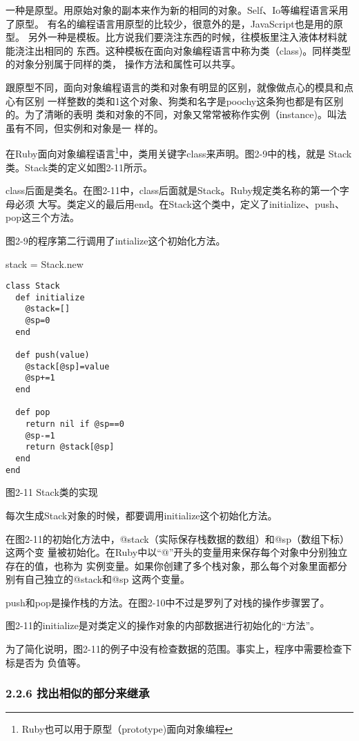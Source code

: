 \documentclass[11pt]{ctexart}
\begin{document}
一种是原型。用原始对象的副本来作为新的相同的对象。Self、Io等编程语言采用了原型。
有名的编程语言用原型的比较少，很意外的是，JavaScript也是用的原型。
另外一种是模板。比方说我们要浇注东西的时候，往模板里注入液体材料就能浇注出相同的
东西。这种模板在面向对象编程语言中称为类（class)。同样类型的对象分别属于同样的类，
操作方法和属性可以共享。

跟原型不同，面向对象编程语言的类和对象有明显的区别，就像做点心的模具和点心有区别
一样整数的类和1这个对象、狗类和名字是poochy这条狗也都是有区别的。为了清晰的表明
类和对象的不同，对象又常常被称作实例（instance)。叫法虽有不同，但实例和对象是一
样的。

在Ruby面向对象编程语言\footnote{Ruby也可以用于原型（prototype)面向对象编程}中，类用关键字class来声明。图2-9中的栈，就是
Stack类。Stack类的定义如图2-11所示。

class后面是类名。在图2-11中，class后面就是Stack。Ruby规定类名称的第一个字母必须
大写。类定义的最后用end。在Stack这个类中，定义了initialize、push、pop这三个方法。

图2-9的程序第二行调用了intialize这个初始化方法。

stack = Stack.new

\lstset{language=org,label= ,caption= ,captionpos=b,numbers=none}
\begin{lstlisting}
class Stack
  def initialize
    @stack=[]
    @sp=0
  end

  def push(value)
    @stack[@sp]=value
    @sp+=1 
  end

  def pop
    return nil if @sp==0
    @sp-=1 
    return @stack[@sp]
  end
end
\end{lstlisting}
图2-11 Stack类的实现

每次生成Stack对象的时候，都要调用initialize这个初始化方法。

在图2-11的初始化方法中，@stack（实际保存栈数据的数组）和@sp（数组下标）这两个变
量被初始化。在Ruby中以“@”开头的变量用来保存每个对象中分别独立存在的值，也称为
实例变量。如果你创建了多个栈对象，那么每个对象里面都分别有自己独立的@stack和@sp
这两个变量。

push和pop是操作栈的方法。在图2-10中不过是罗列了对栈的操作步骤罢了。

图2-11的initialize是对类定义的操作对象的内部数据进行初始化的“方法”。

为了简化说明，图2-11的例子中没有检查数据的范围。事实上，程序中需要检查下标是否为
负值等。
\subsubsection{2.2.6 找出相似的部分来继承}
\label{sec:orgf6e9d1f}
\end{document}
